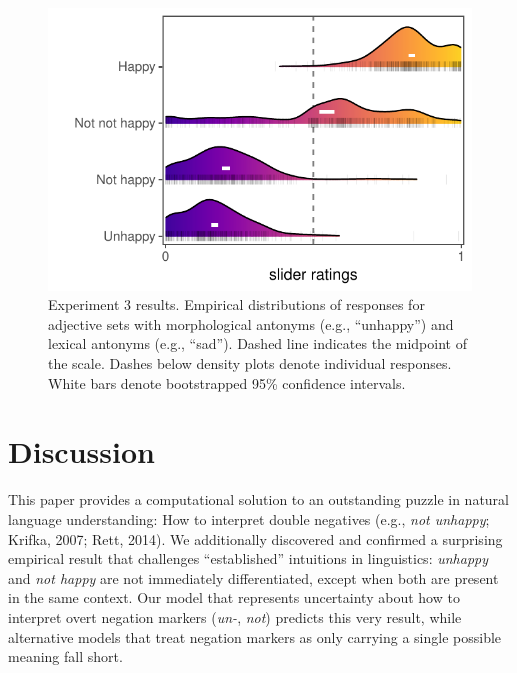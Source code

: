 \documentclass[floatsintext,doc]{apa6}
\begin{document}
\begin{figure}[h]
\centering \includegraphics[width=0.95\linewidth]{figs/expt3_ridges_wCIs} 
\caption{ Experiment 3 results. Empirical distributions of responses for adjective sets with morphological antonyms (e.g., ``unhappy'') and lexical antonyms (e.g., ``sad''). Dashed line indicates the midpoint of the scale. Dashes below density plots denote individual responses. White bars denote bootstrapped 95\% confidence intervals.}\label{fig:expt3-results}
\end{figure}


\section{Discussion}\label{discussion}


This paper provides a computational solution to an outstanding puzzle in natural language understanding: How to interpret double negatives (e.g., \emph{not unhappy}; Krifka, 2007; Rett, 2014).
We additionally discovered and confirmed a surprising empirical result that challenges ``established'' intuitions in linguistics: \emph{unhappy} and \emph{not happy} are not immediately differentiated, except when both are present in the same context.
Our model that represents uncertainty about how to interpret overt negation markers (\emph{un-}, \emph{not}) predicts this very result, while alternative models that treat negation markers as only carrying a single possible meaning fall short.
\end{document}
